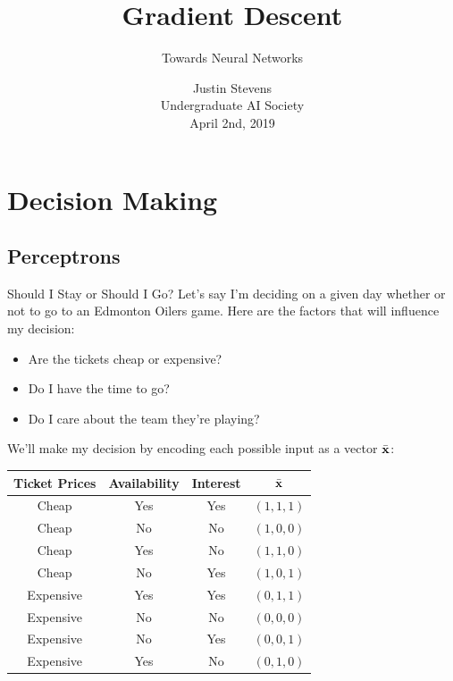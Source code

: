 \documentclass[xcolor=dvipsnames, fontsize=11pt, %
pagesize, %
parskip=half-, t]{beamer}
\title[Artificial Intelligence for Beginners]{Gradient Descent}
\subtitle{Towards Neural Networks}
\author[Justin Stevens]{\large Justin Stevens \\ \large Undergraduate AI Society \\  April 2nd, 2019} %
\date{}
\begin{document}
	\renewcommand{\thefootnote}{\fnsymbol{footnote}}
	\begin{frame}[c]
	\centering
	\titlepage
\end{frame}
\section{Decision Making}
\subsection{Perceptrons}
\begin{frame}{Should I Stay or Should I Go?}
Let's say I'm deciding on a given day whether or not to go to  an Edmonton Oilers game. Here are the factors that will influence my decision:  
\begin{itemize}
\item Are the tickets cheap or expensive?
\item Do I have the time to go?
\item Do I care about the team they're playing?
\end{itemize}  
We'll make my decision by encoding each possible input as a vector $\bar{\bold{x}}$: 
\begin{table} \center 
\begin{tabular}{ccc|c}
Ticket Prices & Availability & Interest & $\bar{\bold{x}}$\\ \hline 
Cheap & Yes & Yes & $(1,1,1)$ \\
Cheap & No & No & $(1,0,0)$ \\
Cheap & Yes & No & $(1,1,0)$ \\
Cheap & No & Yes & $(1,0,1)$  \\
Expensive & Yes & Yes & $(0,1,1)$ \\
Expensive & No & No & $(0,0,0)$ \\
Expensive & No & Yes & $(0,0,1)$ \\
Expensive & Yes & No & $(0,1,0)$ 
\end{tabular}
\end{table}
\end{frame}
\end{document}
